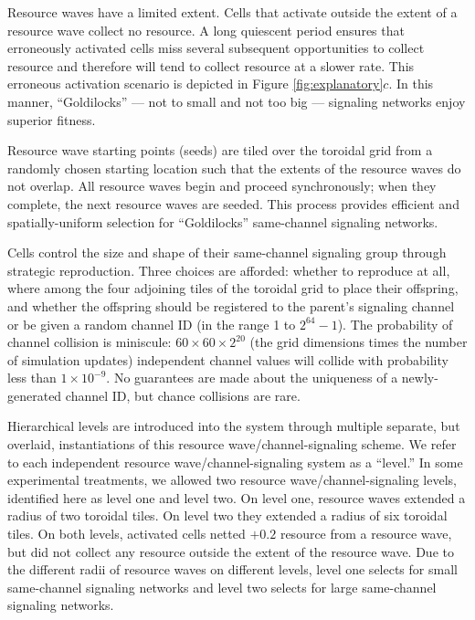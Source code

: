 Resource waves have a limited extent.
Cells that activate outside the extent of a resource wave collect no resource.
A long quiescent period ensures that erroneously activated cells miss several subsequent opportunities to collect resource and therefore will tend to collect resource at a slower rate.
This erroneous activation scenario is depicted in Figure \ref{fig:explanatory}$c$.
In this manner, ``Goldilocks'' --- not to small and not too big --- signaling networks enjoy superior fitness.

Resource wave starting points (seeds) are tiled over the toroidal grid from a randomly chosen starting location such that the extents of the resource waves do not overlap.
All resource waves begin and proceed synchronously;
when they complete, the next resource waves are seeded.
This process provides efficient and spatially-uniform selection for ``Goldilocks'' same-channel signaling networks.

Cells control the size and shape of their same-channel signaling group through strategic reproduction.
Three choices are afforded: whether to reproduce at all, where among the four adjoining tiles of the toroidal grid to place their offspring, and whether the offspring should be registered to the parent's signaling channel or be given a random channel ID (in the range 1 to $2^{64} - 1$).
The probability of channel collision is miniscule: $60 \times 60 \times 2^{20}$ (the grid dimensions times the number of simulation updates) independent channel values will collide with probability less than $1 \times 10^{-9}$.
No guarantees are made about the uniqueness of a newly-generated channel ID, but chance collisions are rare.

Hierarchical levels are introduced into the system through multiple separate, but overlaid, instantiations of this resource wave/channel-signaling scheme.
We refer to each independent resource wave/channel-signaling system as a ``level.''
In some experimental treatments, we allowed two resource wave/channel-signaling levels, identified here as level one and level two.
On level one, resource waves extended a radius of two toroidal tiles.
On level two they extended a radius of six toroidal tiles.
On both levels, activated cells netted $+0.2$ resource from a resource wave, but did not collect any resource outside the extent of the resource wave.
Due to the different radii of resource waves on different levels, level one selects for small same-channel signaling networks and level two selects for large same-channel signaling networks.

